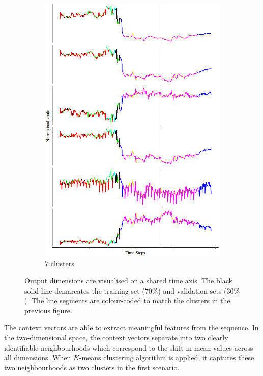 \documentclass[11pt]{article} %
\theoremstyle{plain}
\theoremstyle{definition}
\begin{document}
\begin{figure}[H]
\begin{subfigure}[b]{0.4\textwidth}
		\includegraphics[width=\textwidth]{context_timeline_7.PNG}
		\caption{\(7\) clusters}
		\label{fig:context_timeline_7}
	\end{subfigure}

	\caption{Output dimensions are visualised on a shared time axis. The black solid line demarcates the training set (\(70\%\)) and validation sets (\(30\%\)). The line segments are colour-coded to match the clusters in the previous figure.}
	\label{fig:context_timeline}
\end{figure}

The context vectors are able to extract meaningful features from the sequence. In the two-dimensional space, the context vectors separate into two clearly identifiable neighbourhoods which correspond to the shift in mean values across all dimensions. When \(K\)-means clustering algorithm is applied, it captures these two neighbourhoods as two clusters in the first scenario.
\end{document}
